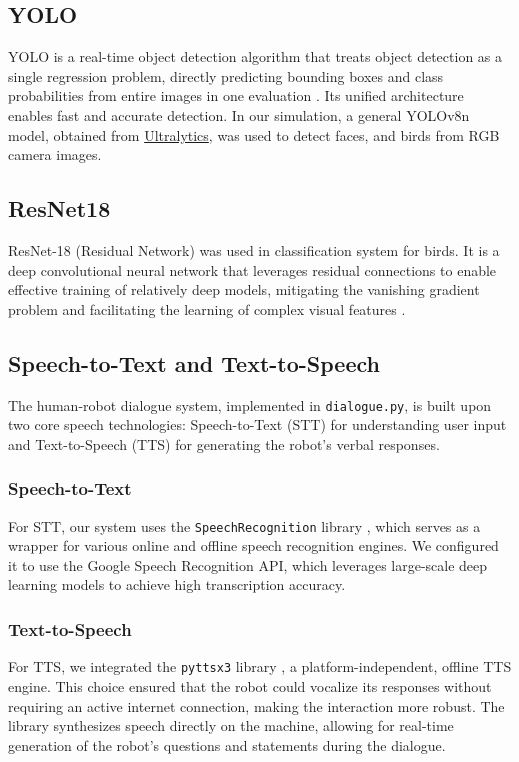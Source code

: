 \documentclass[a4paper]{article}
\begin{document}
\subsection{YOLO}
YOLO is a real-time object detection algorithm that treats object detection as a single regression problem, directly predicting bounding boxes and class probabilities from entire images in one evaluation \cite{Redmon2016}. Its unified architecture enables fast and accurate detection. In our simulation, a general YOLOv8n model, obtained from \href{https://github.com/ultralytics/ultralytics}{Ultralytics}, was used to detect faces, and birds from RGB camera images.

\subsection{ResNet18}
ResNet-18 (Residual Network) was used in classification system for birds. It is a deep convolutional neural network that leverages residual connections to enable effective training of relatively deep models, mitigating the vanishing gradient problem and facilitating the learning of complex visual features \cite{resnet}.

\subsection{Speech-to-Text and Text-to-Speech}
The human-robot dialogue system, implemented in \texttt{dialogue.py}, is built upon two core speech technologies: Speech-to-Text (STT) for understanding user input and Text-to-Speech (TTS) for generating the robot's verbal responses.

\subsubsection{Speech-to-Text}
For STT, our system uses the \texttt{SpeechRecognition} library \cite{speech_recognition_lib}, which serves as a wrapper for various online and offline speech recognition engines. We configured it to use the Google Speech Recognition API, which leverages large-scale deep learning models to achieve high transcription accuracy.

\subsubsection{Text-to-Speech}
For TTS, we integrated the \texttt{pyttsx3} library \cite{pyttsx3_lib}, a platform-independent, offline TTS engine. This choice ensured that the robot could vocalize its responses without requiring an active internet connection, making the interaction more robust. The library synthesizes speech directly on the machine, allowing for real-time generation of the robot's questions and statements during the dialogue.
\end{document}
